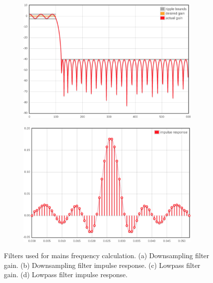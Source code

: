 \begin{figure}[h]
	\begin{subfigure}{.5\textwidth}
	  \centering
	  \includegraphics[width=0.9\linewidth]{img/filter2_gain.png}
	  \caption{}
	  \label{fig:opq:4:3}
	\end{subfigure}%
	\begin{subfigure}{.5\textwidth}
	  \centering
	  \includegraphics[width=0.9\linewidth]{img/filter2_response.png}
	  \caption{}
	  \label{fig:opq:4:4}
	\end{subfigure}
	\caption{Filters used for mains frequency calculation. (a) Downsampling filter gain. (b) Downsampling filter impulse response. (c) Lowpass filter gain. (d) Lowpass filter impulse response.}
	\label{fig:opq:4}
\end{figure}

